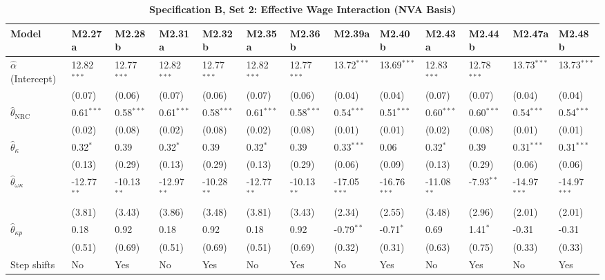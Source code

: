 \FloatBarrier
\begin{table}[h!]
\centering
\caption{\textbf{Specification B, Set 2: Effective Wage Interaction (NVA Basis)}}
\label{tab:specB_set2_nva_app}
\tiny
\setlength{\tabcolsep}{1.5pt}
\begin{tabular}{p{3.2cm}p{1.0cm}p{1.0cm}p{1.0cm}p{1.0cm}p{1.0cm}p{1.0cm}p{1.0cm}p{1.0cm}p{1.0cm}p{1.0cm}p{1.0cm}p{1.0cm}}
\toprule
Model & M2.27a & M2.28b & M2.31a & M2.32b & M2.35a & M2.36b & M2.39a & M2.40b & M2.43a & M2.44b & M2.47a & M2.48b \\
\midrule
$\hat{\alpha}$ (Intercept) & 12.82$^{***}$ & 12.77$^{***}$ & 12.82$^{***}$ & 12.77$^{***}$ & 12.82$^{***}$ & 12.77$^{***}$ & 13.72$^{***}$ & 13.69$^{***}$ & 12.83$^{***}$ & 12.78$^{***}$ & 13.73$^{***}$ & 13.73$^{***}$ \\
 & (0.07) & (0.06) & (0.07) & (0.06) & (0.07) & (0.06) & (0.04) & (0.04) & (0.07) & (0.07) & (0.04) & (0.04) \\
$\hat{\theta}_{\text{NRC}}$ & 0.61$^{***}$ & 0.58$^{***}$ & 0.61$^{***}$ & 0.58$^{***}$ & 0.61$^{***}$ & 0.58$^{***}$ & 0.54$^{***}$ & 0.51$^{***}$ & 0.60$^{***}$ & 0.60$^{***}$ & 0.54$^{***}$ & 0.54$^{***}$ \\
 & (0.02) & (0.08) & (0.02) & (0.08) & (0.02) & (0.08) & (0.01) & (0.01) & (0.02) & (0.08) & (0.01) & (0.01) \\
$\hat{\theta}_{\kappa}$ & 0.32$^{*}$ & 0.39 & 0.32$^{*}$ & 0.39 & 0.32$^{*}$ & 0.39 & 0.33$^{***}$ & 0.06 & 0.32$^{*}$ & 0.39 & 0.31$^{***}$ & 0.31$^{***}$ \\
 & (0.13) & (0.29) & (0.13) & (0.29) & (0.13) & (0.29) & (0.06) & (0.09) & (0.13) & (0.29) & (0.06) & (0.06) \\
$\hat{\theta}_{\omega\kappa}$ & -12.77$^{**}$ & -10.13$^{**}$ & -12.97$^{**}$ & -10.28$^{**}$ & -12.77$^{**}$ & -10.13$^{**}$ & -17.05$^{***}$ & -16.76$^{***}$ & -11.08$^{**}$ & -7.93$^{**}$ & -14.97$^{***}$ & -14.97$^{***}$ \\
 & (3.81) & (3.43) & (3.86) & (3.48) & (3.81) & (3.43) & (2.34) & (2.55) & (3.48) & (2.96) & (2.01) & (2.01) \\
$\hat{\theta}_{\kappa p}$ & 0.18 & 0.92 & 0.18 & 0.92 & 0.18 & 0.92 & -0.79$^{**}$ & -0.71$^{*}$ & 0.69 & 1.41$^{*}$ & -0.31 & -0.31 \\
 & (0.51) & (0.69) & (0.51) & (0.69) & (0.51) & (0.69) & (0.32) & (0.31) & (0.63) & (0.75) & (0.33) & (0.33) \\
\midrule
Step shifts & No & Yes & No & Yes & No & Yes & No & Yes & No & Yes & No & Yes \\

\end{tabular}
\end{table}
